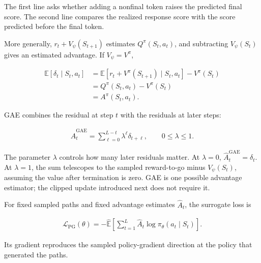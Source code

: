 \documentclass[11pt]{article}
\newcommand{\E}{\mathbb{E}}
\begin{document}
The first line asks whether adding a nonfinal token raises the predicted final
score.  The second line compares the realized response score with the score
predicted before the final token.

More generally, \(r_t+V_\psi(S_{t+1})\) estimates
\(Q^\pi(S_t,a_t)\), and subtracting \(V_\psi(S_t)\) gives an estimated
advantage.  If \(V_\psi=V^\pi\),

\begin{equation}
    \begin{split}
        \E\left[\delta_t\mid S_t,a_t\right]
        &=\E\left[
          r_t+V^\pi(S_{t+1})\mid S_t,a_t
          \right]-V^\pi(S_t)\\
        &=Q^\pi(S_t,a_t)-V^\pi(S_t)\\
        &=A^\pi(S_t,a_t).
    \end{split}
    \label{eq:td-advantage}
\end{equation}

GAE combines the residual at step \(t\) with the residuals at later steps:

\begin{equation}
    \begin{split}
    \widehat A_t^{\mathrm{GAE}}
      =\sum_{\ell=0}^{L-t}
       \lambda^\ell\delta_{t+\ell},
      \qquad 0\leq\lambda\leq1.
    \end{split}
    \label{eq:gae}
\end{equation}

The parameter \(\lambda\) controls how many later residuals matter.  At
\(\lambda=0\), \(\widehat A_t^{\mathrm{GAE}}=\delta_t\).  At \(\lambda=1\),
the sum telescopes to the sampled reward-to-go minus \(V_\psi(S_t)\), assuming
the value after termination is zero.  GAE is one possible advantage estimator;
the clipped update introduced next does not require it.

For fixed sampled paths and fixed advantage estimates \(\widehat A_t\), the
surrogate loss is

\begin{equation}
    \begin{split}
    \mathcal L_{\mathrm{PG}}(\theta)
      =-\widehat{\E}
       \left[
       \sum_{t=1}^{L}
       \widehat A_t
       \log\pi_\theta(a_t\mid S_t)
       \right].
    \end{split}
    \label{eq:policy-gradient-surrogate-expanded}
\end{equation}

Its gradient reproduces the sampled policy-gradient direction at the policy
that generated the paths.
\end{document}
